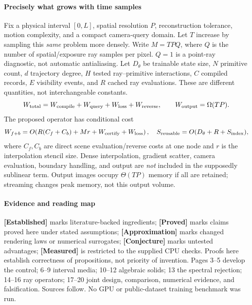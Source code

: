 \documentclass[11pt,letterpaper]{article}
\newcommand{\status}[1]{\textsf{\textbf{[#1]}}}
\newcommand{\mini}[1]{\paragraph{#1}}
\begin{document}
\mini{Precisely what grows with time samples}
Fix a physical interval $[0,L]$, spatial resolution $P$, reconstruction tolerance, motion complexity, and a compact camera-query domain. Let $T$ increase by sampling this \emph{same} problem more densely. Write $M=TPQ$, where $Q$ is the number of spatial/exposure ray samples per pixel. $Q=1$ is a point-ray diagnostic, not automatic antialiasing. Let $D_\theta$ be trainable state size, $N$ primitive count, $d$ trajectory degree, $H$ tested ray--primitive interactions, $C$ compiled records, $E$ visibility events, and $R$ cached ray evaluations. These are different quantities, not interchangeable constants.
\begin{equation}
 W_{\rm total}=W_{\rm compile}+W_{\rm query}+W_{\rm loss}+W_{\rm reverse},\qquad
 W_{\rm output}=\Omega(TP).
 \label{eq:accounting}
\end{equation}
The proposed operator has conditional cost
\begin{equation}
 W_{f+b}=O\!\left(R(C_f+C_b)+Mr+W_{\rm certify}+W_{\rm loss}\right),
 \quad S_{\rm reusable}=O(D_\theta+R+S_{\rm index}),
 \label{eq:headline}
\end{equation}
where $C_f,C_b$ are direct scene evaluation/reverse costs at one node and $r$ is the interpolation stencil size. Dense interpolation, gradient scatter, camera evaluation, boundary handling, and output are \emph{not} included in the supposedly sublinear term. Output images occupy $\Theta(TP)$ memory if all are retained; streaming changes peak memory, not this output volume.

\mini{Evidence and reading map}
\status{Established} marks literature-backed ingredients; \status{Proved} marks claims proved here under stated assumptions; \status{Approximation} marks changed rendering laws or numerical surrogates; \status{Conjecture} marks untested advantages; \status{Measured} is restricted to the supplied CPU checks. Proofs here establish correctness of propositions, not priority of invention. Pages 3--5 develop the control; 6--9 interval media; 10--12 algebraic solids; 13 the spectral rejection; 14--16 ray operators; 17--20 joint design, comparison, numerical evidence, and falsification. Sources follow. No GPU or public-dataset training benchmark was run.
\end{document}
